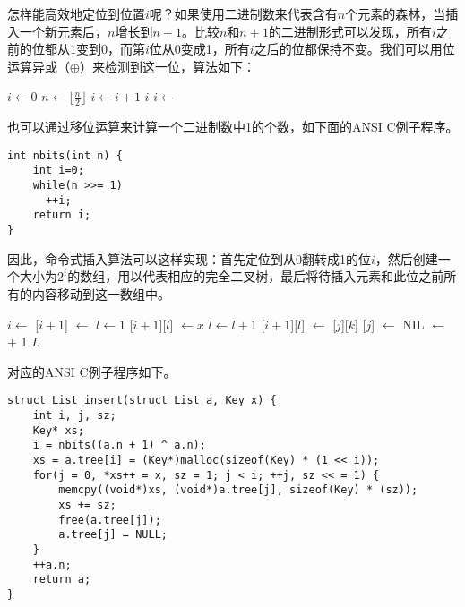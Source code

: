 \documentclass[UTF8]{article}
\begin{document}
怎样能高效地定位到位置$i$呢？如果使用二进制数来代表含有$n$个元素的森林，当插入一个新元素后，$n$增长到$n+1$。比较$n$和$n+1$的二进制形式可以发现，所有$i$之前的位都从1变到0，而第$i$位从0变成1，所有$i$之后的位都保持不变。我们可以用位运算异或（$\oplus$）来检测到这一位，算法如下：

\begin{algorithmic}
  \State $i \gets 0$
    \State $ n \gets \lfloor \frac{n}{2} \rfloor$
    \State $ i \gets i + 1$
  \EndWhile
  \State \Return $i$
\EndFunction
\Statex
\State $i \gets $ 
\end{algorithmic}

也可以通过移位运算来计算一个二进制数中1的个数，如下面的ANSI C例子程序。

\begin{lstlisting}
int nbits(int n) {
    int i=0;
    while(n >>= 1)
      ++i;
    return i;
}
\end{lstlisting}

因此，命令式插入算法可以这样实现：首先定位到从0翻转成1的位$i$，然后创建一个大小为$2^i$的数组，用以代表相应的完全二叉树，最后将待插入元素和此位之前所有的内容移动到这一数组中。

\begin{algorithmic}
  \State $i \gets $ 
  \State {}[$i+1$] $\gets $ 
  \State $l \gets 1$
  \State  {}[$i+1$][$l$]  $\gets x$
      \State $l \gets l + 1$
      \State {}[$i+1$][$l$]  $\gets$ [$j$][$k$]
    \EndFor
    \State {}[$j$] $\gets$ NIL
  \EndFor
  \State {} $\gets$  + 1
  \State \Return $L$
\EndFunction
\end{algorithmic}

对应的ANSI C例子程序如下。

\lstset{language=C}
\begin{lstlisting}
struct List insert(struct List a, Key x) {
    int i, j, sz;
    Key* xs;
    i = nbits((a.n + 1) ^ a.n);
    xs = a.tree[i] = (Key*)malloc(sizeof(Key) * (1 << i));
    for(j = 0, *xs++ = x, sz = 1; j < i; ++j, sz << = 1) {
        memcpy((void*)xs, (void*)a.tree[j], sizeof(Key) * (sz));
        xs += sz;
        free(a.tree[j]);
        a.tree[j] = NULL;
    }
    ++a.n;
    return a;
}
\end{lstlisting}
\end{document}

